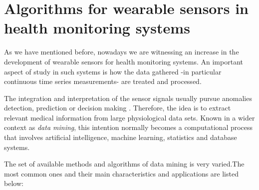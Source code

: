 \section{Algorithms for wearable sensors in health monitoring systems}

As we have mentioned before, nowadays we are witnessing an increase in the development of wearable sensors for health monitoring systems. An important aspect of study in such systems is how the data gathered -in particular continuous time series measurements- are treated and processed. 

The integration and interpretation of the sensor signals usually pursue anomalies detection, prediction or decision making \cite{banaee2013data}. Therefore, the idea is to extract relevant medical information from large physiological data sets. Known in a wider context as \emph{data mining}, this intention normally becomes a computational process that involves artificial intelligence, machine learning, statistics and database systems.

The set of available methods and algorithms of data mining is very varied.The most common ones and their main characteristics and applications are listed below:

